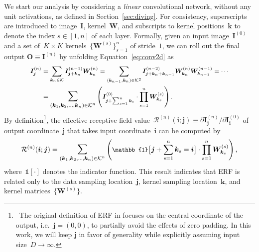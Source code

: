 \documentclass{article} \usepackage{iclr2020_conference, times}
\def\vi{{\bm{i}}}
\def\vj{{\bm{j}}}
\def\vk{{\bm{k}}}
\def\mI{{\bm{I}}}
\def\mO{{\bm{O}}}
\def\mW{{\bm{W}}}
\def\gK{{\mathcal{K}}}
\def\gR{{\mathcal{R}}}
\begin{document}
We start our analysis by considering a \textit{linear} convolutional
network, without any unit activations, as defined in Section~\ref{sec:diving}.
For consistency, superscripts are introduced to image~$\mI$, kernel~$\mW$, and
subscripts to kernel positions~$\vk$ to denote the index $s \in [1, n]$ of each
layer.
Formally, given an input image~$\mI^{(0)}$ and a set of~$K \times K$
kernels~$\{\mW^{(s)}\}_{s = 1}^{n}$ of stride~$1$, we can roll out the final
output $\mO \equiv \mI^{(n)}$ by unfolding Equation~\ref{eq:conv2d} as
\begin{equation}
\small
    \label{eq:unfolding}
    \begin{split}
        \mI^{(n)}_{\vj}
        &=
        \sum_{\vk_{n} \in \gK}
        \mI_{\vj + \vk_{n}}^{(n - 1)}
        \mW_{\vk_{n}}^{(n)}
        =
        \sum_{(\vk_{n - 1}, \vk_{n}) \in \gK^2}
        \mI_{\vj + \vk_{n} + \vk_{n - 1}}^{(n - 2)}
        \mW_{\vk_{n}}^{(n)}
        \mW_{\vk_{n - 1}}^{(n - 1)}
        =
        \cdots
        \\
        &=
        \mathlarger{\mathlarger{\sum}}_{(\vk_1, \vk_2, \ldots, \vk_n) \in \gK^n}
        \left(
            \mI_{\vj + \sum_{s = 1}^{n} \vk_{s}}^{(0)}
            \cdot
            \prod_{s = 1}^{n} \mW^{(s)}_{\vk_s}
        \right).
    \end{split}
\end{equation}
By definition\footnote{\
    The original definition of ERF in
    \cite{luo2016understanding} focuses on the central coordinate of the output,
    i.e.~$\vj = (0, 0)$, to partially avoid the effects of zero padding.
    In this work, we will keep $\vj$ in favor of generality while explicitly
    assuming input size~$D \to \infty$.
}, the effective receptive field value~$\gR^{(n)}(\vi; \vj) \equiv \partial
\mI^{(n)}_{\vj} / \partial \mI^{(0)}_{\vi}$ of output coordinate~$\vj$ that
takes input coordinate~$\vi$ can be computed by
\begin{equation}
\small
    \label{eq:erf-grad}
    \gR^{(n)}(\vi; \vj)
    =
    \mathlarger{\mathlarger{\sum}}_{(\vk_1, \vk_2, \ldots, \vk_n) \in \gK^n}
    \left(
        \mathbb{1}\big[
            \vj + \sum_{s = 1}^{n} \vk_{s} = \vi
        \big]
        \cdot
        \prod_{s = 1}^{n} \mW^{(s)}_{\vk_s}
    \right),
\end{equation}
where~$\mathbb{1}[\cdot]$ denotes the indicator function. This result indicates
that ERF is related only to the data sampling location~$\vj$, kernel sampling
location~$\vk$, and kernel matrices~$\{\mW^{(s)}\}$.
\end{document}

